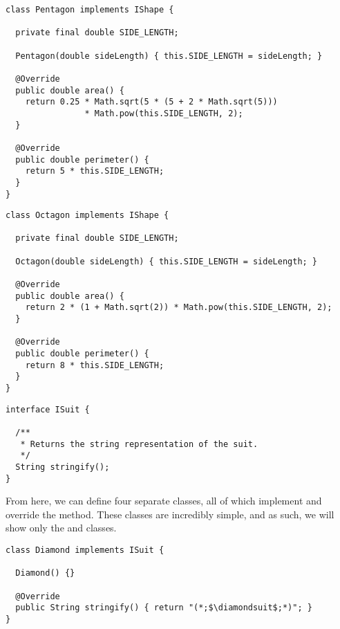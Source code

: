 \begin{lstlisting}[language=MyJava]
class Pentagon implements IShape {
  
  private final double SIDE_LENGTH;

  Pentagon(double sideLength) { this.SIDE_LENGTH = sideLength; }

  @Override
  public double area() {
    return 0.25 * Math.sqrt(5 * (5 + 2 * Math.sqrt(5))) 
                * Math.pow(this.SIDE_LENGTH, 2);
  }

  @Override
  public double perimeter() {
    return 5 * this.SIDE_LENGTH;
  }
}
\end{lstlisting}

\begin{lstlisting}[language=MyJava]
class Octagon implements IShape {

  private final double SIDE_LENGTH;

  Octagon(double sideLength) { this.SIDE_LENGTH = sideLength; }

  @Override
  public double area() {
    return 2 * (1 + Math.sqrt(2)) * Math.pow(this.SIDE_LENGTH, 2);
  }

  @Override
  public double perimeter() {
    return 8 * this.SIDE_LENGTH;
  }
}
\end{lstlisting}


\begin{lstlisting}[language=MyJava]
interface ISuit {

  /**
   * Returns the string representation of the suit.
   */
  String stringify();
}
\end{lstlisting}

From here, we can define four separate classes, all of which implement  and override the  method. These classes are incredibly simple, and as such, we will show only the  and  classes.

\begin{lstlisting}[language=MyJava]
class Diamond implements ISuit {
  
  Diamond() {}

  @Override
  public String stringify() { return "(*;$\diamondsuit$;*)"; }
}
\end{lstlisting}

